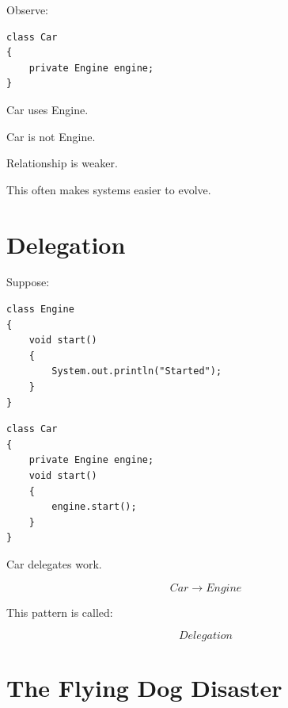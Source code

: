\documentclass[11pt,a4paper]{book}
\begin{document}
Observe:

\begin{verbatim}
class Car
{
    private Engine engine;
}
\end{verbatim}


Car uses Engine.


Car is not Engine.


Relationship is weaker.


This often makes systems easier
to evolve.


\section{Delegation}

Suppose:

\begin{verbatim}
class Engine
{
    void start()
    {
        System.out.println("Started");
    }
}
\end{verbatim}


\begin{verbatim}
class Car
{
    private Engine engine;
    void start()
    {
        engine.start();
    }
}
\end{verbatim}


Car delegates work.


\[
Car
\rightarrow
Engine
\]


This pattern is called:

\[
Delegation
\]


\section{The Flying Dog Disaster}
\end{document}
